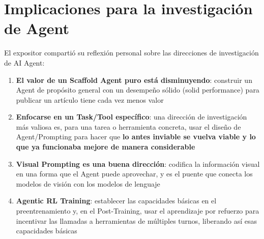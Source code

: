 \section{Implicaciones para la investigación de Agent}

El expositor compartió su reflexión personal sobre las direcciones de investigación de AI Agent:

\begin{enumerate}
    \item \textbf{El valor de un Scaffold Agent puro está disminuyendo}: construir un Agent de propósito general con un desempeño sólido (solid performance) para publicar un artículo tiene cada vez menos valor
    \item \textbf{Enfocarse en un Task/Tool específico}: una dirección de investigación más valiosa es, para una tarea o herramienta concreta, usar el diseño de Agent/Prompting para hacer que \textbf{lo antes inviable se vuelva viable y lo que ya funcionaba mejore de manera considerable}
    \item \textbf{Visual Prompting es una buena dirección}: codifica la información visual en una forma que el Agent puede aprovechar, y es el puente que conecta los modelos de visión con los modelos de lenguaje
    \item \textbf{Agentic RL Training}: establecer las capacidades básicas en el preentrenamiento y, en el Post-Training, usar el aprendizaje por refuerzo para incentivar las llamadas a herramientas de múltiples turnos, liberando así esas capacidades básicas
\end{enumerate}

